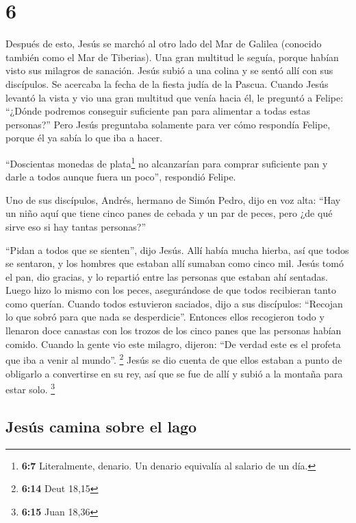 \hypertarget{section-5}{%
\section{6}\label{section-5}}

 Después de esto, Jesús se marchó al otro lado del Mar de
Galilea (conocido también como el Mar de Tiberias).  Una
gran multitud le seguía, porque habían visto sus milagros de sanación.
 Jesús subió a una colina y se sentó allí con sus
discípulos.  Se acercaba la fecha de la fiesta judía de la
Pascua.  Cuando Jesús levantó la vista y vio una gran
multitud que venía hacia él, le preguntó a Felipe: ``¿Dónde podremos
conseguir suficiente pan para alimentar a todas estas personas?''
 Pero Jesús preguntaba solamente para ver cómo respondía
Felipe, porque él ya sabía lo que iba a hacer.

 ``Doscientas monedas de plata\footnote{\textbf{6:7}
  Literalmente, denario. Un denario equivalía al salario de un día.} no
alcanzarían para comprar suficiente pan y darle a todos aunque fuera un
poco'', respondió Felipe.

 Uno de sus discípulos, Andrés, hermano de Simón Pedro,
dijo en voz alta:  ``Hay un niño aquí que tiene cinco
panes de cebada y un par de peces, pero ¿de qué sirve eso si hay tantas
personas?''

 ``Pidan a todos que se sienten'', dijo Jesús. Allí había
mucha hierba, así que todos se sentaron, y los hombres que estaban allí
sumaban como cinco mil.  Jesús tomó el pan, dio gracias,
y lo repartió entre las personas que estaban ahí sentadas. Luego hizo lo
mismo con los peces, asegurándose de que todos recibieran tanto como
querían.  Cuando todos estuvieron saciados, dijo a sus
discípulos: ``Recojan lo que sobró para que nada se desperdicie''.
 Entonces ellos recogieron todo y llenaron doce canastas
con los trozos de los cinco panes que las personas habían comido.
 Cuando la gente vio este milagro, dijeron: ``De verdad
este es el profeta que iba a venir al mundo''. \footnote{\textbf{6:14}
  Deut 18,15}  Jesús se dio cuenta de que ellos estaban a
punto de obligarlo a convertirse en su rey, así que se fue de allí y
subió a la montaña para estar solo. \footnote{\textbf{6:15} Juan 18,36}

\hypertarget{jesuxfas-camina-sobre-el-lago}{%
\subsection{Jesús camina sobre el
lago}\label{jesuxfas-camina-sobre-el-lago}}

